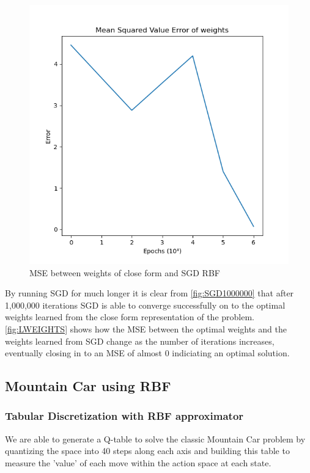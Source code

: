 \documentclass[sigconf]{acmart}
\begin{document}
\begin{figure}
    \begin{minipage}{.3\textwidth}
      \centering
      \includegraphics[width=0.8\linewidth]{../RBF-R/LWEIGHTS.png}
      \caption{MSE between weights of close form and SGD RBF}
      \label{fig:LWEIGHTS}
    \end{minipage}
  \end{figure}

By running SGD for much longer it is clear from \autoref{fig:SGD1000000} that after 1,000,000 iterations SGD is able to converge successfully on to the optimal weights learned from the close form representation of the problem.
\autoref{fig:LWEIGHTS} shows how the MSE between the optimal weights and the weights learned from SGD change as the number of iterations increases, eventually closing in to an MSE of almost 0 indiciating an optimal solution.

\subsection{Mountain Car using RBF}
\subsubsection{Tabular Discretization with RBF approximator}

We are able to generate a Q-table to solve the classic Mountain Car problem by quantizing the space into 40 steps along each axis and building this table to measure the 'value' of each move within the action space at each state.
\end{document}
